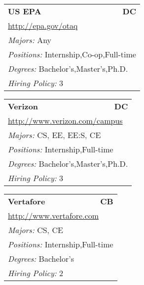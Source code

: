 \documentclass[twoside]{article}
\begin{document}
\begin{center}
\begin{multicols}{3}
\begin{FlushLeft}
\begin{minipage}{\columnwidth}
\end{minipage}
 
\begin{minipage}{\columnwidth}\begin{tabularx}{.95\columnwidth}{Xr}
                 {\Large\bf US EPA} & {\Large\bf DC}\\
    \multicolumn{2}{p{.95\columnwidth}}{\url{http://epa.gov/otaq}}\\
    \multicolumn{2}{p{.95\columnwidth}}{\emph{Majors:} Any}\\
    \multicolumn{2}{p{.95\columnwidth}}{\emph{Positions:} Internship,Co-op,Full-time}\\
    \multicolumn{2}{p{.95\columnwidth}}{\emph{Degrees:} Bachelor's,Master's,Ph.D.}\\
    \multicolumn{2}{p{.95\columnwidth}}{\emph{Hiring Policy:} 3}\\
    \end{tabularx}
    
\end{minipage}
 
\begin{minipage}{\columnwidth}\begin{tabularx}{.95\columnwidth}{Xr}
                 {\Large\bf Verizon} & {\Large\bf DC}\\
    \multicolumn{2}{p{.95\columnwidth}}{\url{http://www.verizon.com/campus}}\\
    \multicolumn{2}{p{.95\columnwidth}}{\emph{Majors:} CS, EE, EE:S, CE}\\
    \multicolumn{2}{p{.95\columnwidth}}{\emph{Positions:} Internship,Full-time}\\
    \multicolumn{2}{p{.95\columnwidth}}{\emph{Degrees:} Bachelor's,Master's,Ph.D.}\\
    \multicolumn{2}{p{.95\columnwidth}}{\emph{Hiring Policy:} 3}\\
    \end{tabularx}
    
\end{minipage}
 
\begin{minipage}{\columnwidth}\begin{tabularx}{.95\columnwidth}{Xr}
                 {\Large\bf Vertafore} & {\Large\bf CB}\\
    \multicolumn{2}{p{.95\columnwidth}}{\url{http://www.vertafore.com}}\\
    \multicolumn{2}{p{.95\columnwidth}}{\emph{Majors:} CS, CE}\\
    \multicolumn{2}{p{.95\columnwidth}}{\emph{Positions:} Internship,Full-time}\\
    \multicolumn{2}{p{.95\columnwidth}}{\emph{Degrees:} Bachelor's}\\
    \multicolumn{2}{p{.95\columnwidth}}{\emph{Hiring Policy:} 2}\\
    \end{tabularx}
    

\end{minipage}
\end{FlushLeft}
\end{multicols}
\end{center}
\end{document}
